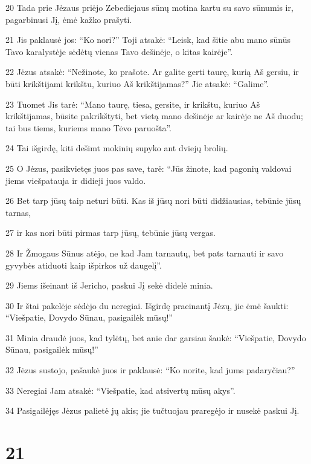 \par 20 Tada prie Jėzaus priėjo Zebediejaus sūnų motina kartu su savo sūnumis ir, pagarbinusi Jį, ėmė kažko prašyti. 
\par 21 Jis paklausė jos: “Ko nori?” Toji atsakė: “Leisk, kad šitie abu mano sūnūs Tavo karalystėje sėdėtų vienas Tavo dešinėje, o kitas kairėje”. 
\par 22 Jėzus atsakė: “Nežinote, ko prašote. Ar galite gerti taurę, kurią Aš gersiu, ir būti krikštijami krikštu, kuriuo Aš krikštijamas?” Jie atsakė: “Galime”. 
\par 23 Tuomet Jis tarė: “Mano taurę, tiesa, gersite, ir krikštu, kuriuo Aš krikštijamas, būsite pakrikštyti, bet vietą mano dešinėje ar kairėje ne Aš duodu; tai bus tiems, kuriems mano Tėvo paruošta”. 
\par 24 Tai išgirdę, kiti dešimt mokinių supyko ant dviejų brolių. 
\par 25 O Jėzus, pasikvietęs juos pas save, tarė: “Jūs žinote, kad pagonių valdovai jiems viešpatauja ir didieji juos valdo. 
\par 26 Bet tarp jūsų taip neturi būti. Kas iš jūsų nori būti didžiausias, tebūnie jūsų tarnas, 
\par 27 ir kas nori būti pirmas tarp jūsų, tebūnie jūsų vergas. 
\par 28 Ir Žmogaus Sūnus atėjo, ne kad Jam tarnautų, bet pats tarnauti ir savo gyvybės atiduoti kaip išpirkos už daugelį”. 
\par 29 Jiems išeinant iš Jericho, paskui Jį sekė didelė minia. 
\par 30 Ir štai pakelėje sėdėjo du neregiai. Išgirdę praeinantį Jėzų, jie ėmė šaukti: “Viešpatie, Dovydo Sūnau, pasigailėk mūsų!” 
\par 31 Minia draudė juos, kad tylėtų, bet anie dar garsiau šaukė: “Viešpatie, Dovydo Sūnau, pasigailėk mūsų!” 
\par 32 Jėzus sustojo, pašaukė juos ir paklausė: “Ko norite, kad jums padaryčiau?” 
\par 33 Neregiai Jam atsakė: “Viešpatie, kad atsivertų mūsų akys”. 
\par 34 Pasigailėjęs Jėzus palietė jų akis; jie tučtuojau praregėjo ir nusekė paskui Jį.



\chapter{21}


